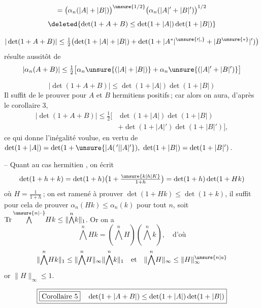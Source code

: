 \[
=\bigl(\alpha_n(|A|+|B|)\bigr)^{\unsure{1/2}}\bigl(\alpha_n(|A|'+|B|')\bigr)^{1/2}
\]
\[
\deleted{\det(1+A+B)\leq\det(1+|A|)\det(1+|B|)}
\]

\[
|\det(1+A+B)|\leq\tfrac12\bigl(\det(1+|A|+|B|)+\det(1+|A^*|^{\unsure{\prime|,}}+|B^{\unsure{*}}|')\bigr)
\]
résulte aussitôt de
\[
|\alpha_n(A+B)|\leq\tfrac12\bigl[\alpha_n\unsure{(|A|+|B|)}+\alpha_n\unsure{(|A|'+|B|')}\bigr]
\]

\[
\boxed{|\det(1+A+B)|\leq\det(1+|A|)\det(1+|B|)}
\]
Il suffit de  le prouver pour $A$ et $B$
hermitiens positifs\,; car alors on aura, d'après
le corollaire 3,
\[
\begin{aligned}
|\det(1+A+B)|\leq\tfrac12\bigl[&\det(1+|A|)\det(1+|B|)\\
&+\det(1+|A|')\det(1+|B|')\bigr],
\end{aligned}
\]
ce qui donne l'inégalité voulue, en vertu de
$\det(1+|A|)=\det(1+\unsure{\lvert A(\,{}'|\lvert A\rvert'}),\ \det(1+|B|)=\det(1+|B|')$.

-- Quant au cas hermitien , on écrit
\[
\det(1+h+k)=\det(1+h)\bigl(1+\tfrac{\unsure{k|h|K}}{1+h}\bigr)=\det(1+h)\det(1+Hk)
\]
où $H=\frac{1}{1+h}$\,; on est ramené à prouver
$\det(1+Hk)\leq\det(1+k)$, il suffit pour cela
de prouver $\alpha_n(Hk)\leq\alpha_n(k)$ pour tout $n$,
soit $\operatorname{Tr}\overset{\unsure{n|\text{--}}}{\bigwedge}Hk\leq\|\overset{n}{\bigwedge}k\|_1$. Or on a
\[
\overset{n}{\bigwedge}Hk=(\overset{n}{\bigwedge}H)(\overset{n}{\bigwedge}k),\quad\text{d'où}
\]
\[
\|\overset{n}{\bigwedge}Hk\|_1\leq\|\overset{n}{\bigwedge}H\|_\infty\|\overset{n}{\bigwedge}k\|_1
\quad\text{et}\quad\|\overset{n}{\bigwedge}H\|_\infty\leq\|H\|_\infty^{\unsure{n|a}}
\]
\margin{\unsure{!}}or $\|H\|_\infty\leq1$.

\[
\boxed{\text{\fbox{Corollaire 5}}\quad\det(1+|A+B|)\leq\det(1+|A|)\det(1+|B|)}
\]
